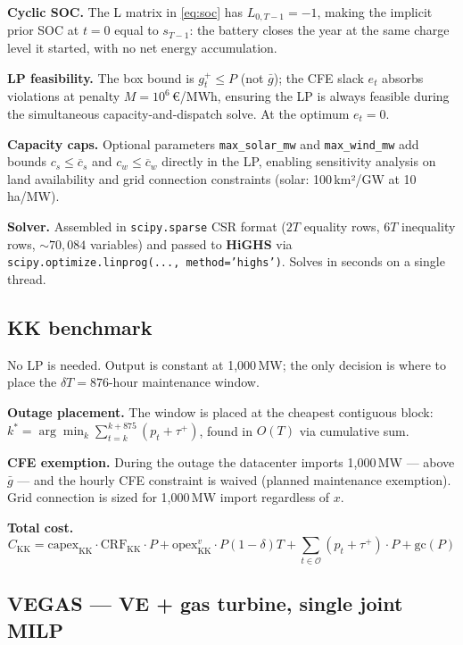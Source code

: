 \documentclass[10.5pt]{article}
\begin{document}
\textbf{Cyclic SOC.} The L matrix in \eqref{eq:soc} has $L_{0,T-1}=-1$, making the
implicit prior SOC at $t=0$ equal to $s_{T-1}$: the battery closes the year at the same
charge level it started, with no net energy accumulation.

\textbf{LP feasibility.} The box bound is $g^+_t \leq P$ (not $\bar{g}$); the CFE slack
$e_t$ absorbs violations at penalty $M=10^6$\,€/MWh, ensuring the LP is always feasible
during the simultaneous capacity-and-dispatch solve. At the optimum $e_t=0$.

\textbf{Capacity caps.} Optional parameters \texttt{max\_solar\_mw} and
\texttt{max\_wind\_mw} add bounds $c_s \leq \overline{c}_s$ and $c_w \leq
\overline{c}_w$ directly in the LP, enabling sensitivity analysis on land
availability and grid connection constraints (solar: 100\,km²/GW at
10\,ha/MW).

\textbf{Solver.} Assembled in \texttt{scipy.sparse} CSR format ($2T$ equality rows,
$6T$ inequality rows, ${\sim}70{,}084$ variables) and passed to \textbf{HiGHS} via
\texttt{scipy.optimize.linprog(..., method='highs')}. Solves in seconds on a single
thread.

\subsection*{KK benchmark}

No LP is needed. Output is constant at 1{,}000\,MW; the only decision is where to
place the $\delta T = 876$-hour maintenance window.

\textbf{Outage placement.} The window is placed at the cheapest contiguous block:
$k^* = \arg\min_k \sum_{t=k}^{k+875}(p_t+\tau^+)$, found in $O(T)$ via cumulative sum.

\textbf{CFE exemption.} During the outage the datacenter imports 1{,}000\,MW —
above $\bar{g}$ — and the hourly CFE constraint is waived (planned maintenance
exemption). Grid connection is sized for 1{,}000\,MW import regardless of $x$.

\textbf{Total cost.}
\[
  C_{\text{KK}} =
    \text{capex}_{\text{KK}}\cdot\text{CRF}_{\text{KK}}\cdot P
    + \text{opex}^v_{\text{KK}}\cdot P(1-\delta)T
    + \sum_{t \in \mathcal{O}} (p_t + \tau^+)\cdot P
    + \text{gc}(P)
\]

\subsection*{VEGAS — VE + gas turbine, single joint MILP}
\end{document}
